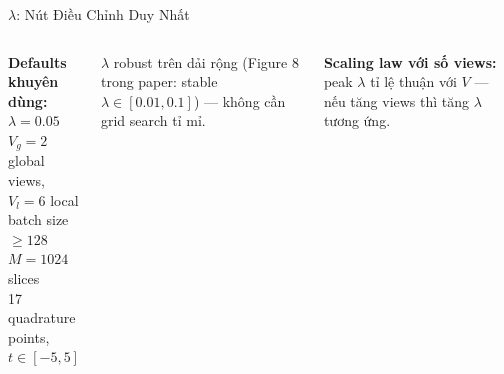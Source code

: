 \documentclass[aspectratio=169,9pt]{beamer}
\begin{document}
\begin{frame}{$\lambda$: Nút Điều Chỉnh Duy Nhất}
\begin{columns}[T]
\vspace{0.3em}

\begin{primarybox}
\footnotesize \textbf{Defaults khuyên dùng:}\\[3pt]
$\lambda = 0.05$\\
$V_g=2$ global views, $V_l=6$ local\\
batch size $\geq 128$\\
$M=1024$ slices\\
17 quadrature points, $t\in[-5,5]$
\end{primarybox}

\vspace{0.5em}
\begin{goodbox}
\footnotesize $\lambda$ robust trên dải rộng (Figure 8 trong paper: stable $\lambda\in[0.01, 0.1]$) — không cần grid search tỉ mỉ.
\end{goodbox}

\vspace{0.5em}
\textbf{Scaling law với số views:} peak $\lambda$ tỉ lệ thuận với $V$ — nếu tăng views thì tăng $\lambda$ tương ứng.

\end{columns}
\end{frame}
\end{document}
